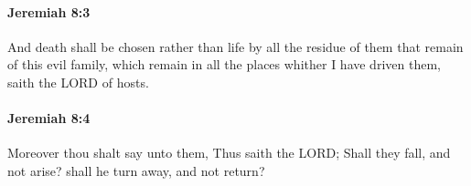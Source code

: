 		\paragraph{Jeremiah 8:3} %
			\label{JEREMIAH-8-3}

			And death shall be chosen rather than life by all the residue of them that remain of this evil family, which remain in all the places whither I have driven them, saith the LORD of hosts.


		\paragraph{Jeremiah 8:4} %
			\label{JEREMIAH-8-4}

			Moreover thou shalt say unto them, Thus saith the LORD; Shall they fall, and not arise? shall he turn away, and not return?


